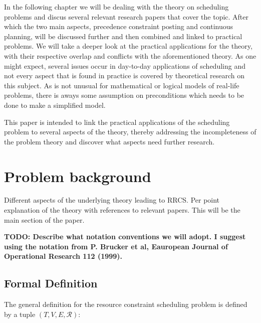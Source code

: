 \documentclass{article}
\newcommand{\TODO}[1]{{\color{red}\textbf{TODO: #1}}}
\begin{document}
In the following chapter we will be dealing with the theory on scheduling problems and discus several relevant research papers that cover the topic.
After which the two main aspects, precedence constraint posting and continuous planning, will be discussed further and then combined and linked to practical problems.
We will take a deeper look at the practical applications for the theory, with their respective overlap and conflicts with the aforementioned theory.
As one might expect, several issues occur in day-to-day applications of scheduling and not every aspect that is found in practice is covered by theoretical research on this subject.
As is not unusual for mathematical or logical models of real-life problems, there is aways some assumption on preconditions which needs to be done to make a simplified model.

This paper is intended to link the practical applications of the scheduling problem to several aspects of the theory, thereby addressing the incompleteness of the problem theory and discover what aspects need further research.

\newpage

\section{Problem background}

Different aspects of the underlying theory leading to RRCS.  Per point explanation of the theory with references to relevant papers. This will be the main section of the paper.

\TODO{Describe what notation conventions we will adopt. I suggest using the notation from P. Brucker et al, Eauropean Journal of Operational Research 112 (1999). }

\subsection{Formal Definition}
The general definition for the resource constraint scheduling problem is defined by a tuple $(T, V, E, \mathcal{R})$: \cite{brucker99}
\end{document}
